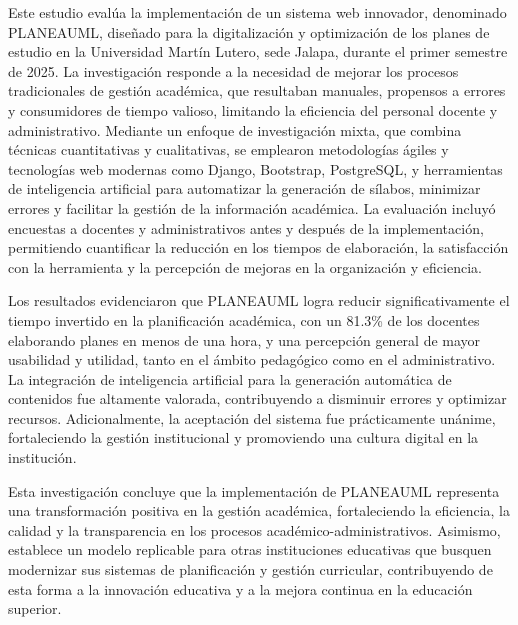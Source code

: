 

Este estudio evalúa la implementación de un sistema web innovador, denominado PLANEAUML, diseñado para la digitalización y optimización de los planes de estudio en la Universidad Martín Lutero, sede Jalapa, durante el primer semestre de 2025. La investigación responde a la necesidad de mejorar los procesos tradicionales de gestión académica, que resultaban manuales, propensos a errores y consumidores de tiempo valioso, limitando la eficiencia del personal docente y administrativo.
Mediante un enfoque de investigación mixta, que combina técnicas cuantitativas y cualitativas, se emplearon metodologías ágiles y tecnologías web modernas como Django, Bootstrap, PostgreSQL, y herramientas de inteligencia artificial para automatizar la generación de sílabos, minimizar errores y facilitar la gestión de la información académica. La evaluación incluyó encuestas a docentes y administrativos antes y después de la implementación, permitiendo cuantificar la reducción en los tiempos de elaboración, la satisfacción con la herramienta y la percepción de mejoras en la organización y eficiencia.

Los resultados evidenciaron que PLANEAUML logra reducir significativamente el tiempo invertido en la planificación académica, con un 81.3\% de los docentes elaborando planes en menos de una hora, y una percepción general de mayor usabilidad y utilidad, tanto en el ámbito pedagógico como en el administrativo. La integración de inteligencia artificial para la generación automática de contenidos fue altamente valorada, contribuyendo a disminuir errores y optimizar recursos. Adicionalmente, la aceptación del sistema fue prácticamente unánime, fortaleciendo la gestión institucional y promoviendo una cultura digital en la institución.

Esta investigación concluye que la implementación de PLANEAUML representa una transformación positiva en la gestión académica, fortaleciendo la eficiencia, la calidad y la transparencia en los procesos académico-administrativos. Asimismo, establece un modelo replicable para otras instituciones educativas que busquen modernizar sus sistemas de planificación y gestión curricular, contribuyendo de esta forma a la innovación educativa y a la mejora continua en la educación superior.
